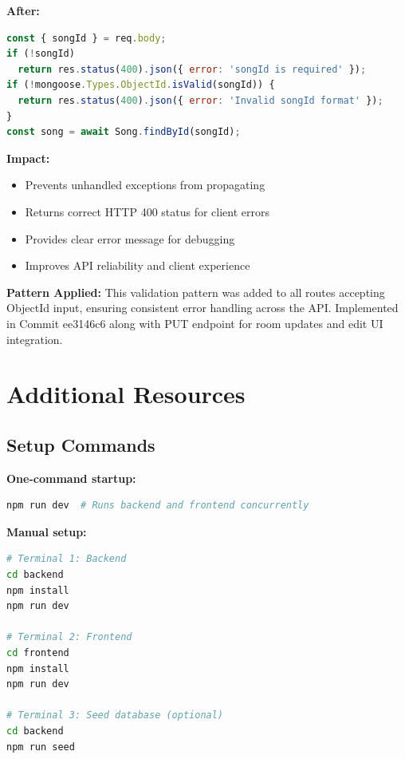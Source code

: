 \documentclass[11pt,a4paper]{article}
\begin{document}
\textbf{After:}
\begin{lstlisting}[language=javascript]
const { songId } = req.body;
if (!songId) 
  return res.status(400).json({ error: 'songId is required' });
if (!mongoose.Types.ObjectId.isValid(songId)) {
  return res.status(400).json({ error: 'Invalid songId format' });
}
const song = await Song.findById(songId);
\end{lstlisting}

\textbf{Impact:}
\begin{itemize}
    \item Prevents unhandled exceptions from propagating
    \item Returns correct HTTP 400 status for client errors
    \item Provides clear error message for debugging
    \item Improves API reliability and client experience
\end{itemize}

\textbf{Pattern Applied:} This validation pattern was added to all routes accepting ObjectId input, ensuring consistent error handling across the API. Implemented in Commit ee3146c6 along with PUT endpoint for room updates and edit UI integration.

\appendix
\section{Additional Resources}

\subsection{Setup Commands}

\textbf{One-command startup:}
\begin{lstlisting}[language=bash]
npm run dev  # Runs backend and frontend concurrently
\end{lstlisting}

\textbf{Manual setup:}
\begin{lstlisting}[language=bash]
# Terminal 1: Backend
cd backend
npm install
npm run dev

# Terminal 2: Frontend
cd frontend
npm install
npm run dev

# Terminal 3: Seed database (optional)
cd backend
npm run seed
\end{lstlisting}
\end{document}
